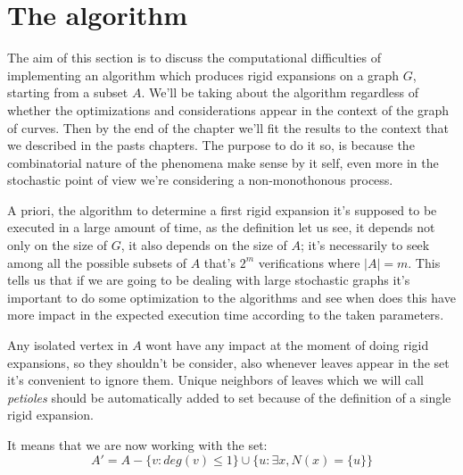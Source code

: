 \section{The algorithm}
The aim of this section is to discuss the computational difficulties of implementing an algorithm which produces rigid expansions on a graph $G$, starting from a subset $A$. We'll be taking about the algorithm regardless of whether the optimizations and considerations appear in the context of the graph of curves. Then by the end of the chapter we'll fit the results to the context that we described in the pasts chapters. The purpose to do it so, is because the combinatorial nature of the phenomena make sense by it self, even more in the stochastic point of view we're considering a non-monothonous process.

A priori, the algorithm to determine a first rigid expansion it's supposed to be executed in a large amount of time, as the definition let us see, it depends not only on the size of $G$, it also depends on the size of $A$; it's necessarily to seek among all the possible subsets of $A$ that's $2^{m}$ verifications where $|A| = m$. This tells us that if we are going to be dealing with large stochastic graphs it's important to do some optimization to the algorithms and see when does this have more impact in the expected execution time according to the taken parameters.

Any isolated vertex in $A$ wont have any impact at the moment of doing rigid expansions, so they shouldn't be consider, also whenever leaves appear in the set it's convenient to ignore them. Unique neighbors of leaves which we will call \textit{petioles} should be automatically added to set because of the definition of a single rigid expansion.

It means that we are now working with the set:
$$A' = A - \{v: deg(v)\leq 1 \} \cup \{u: \exists x, N(x)=\{u\}\} $$

